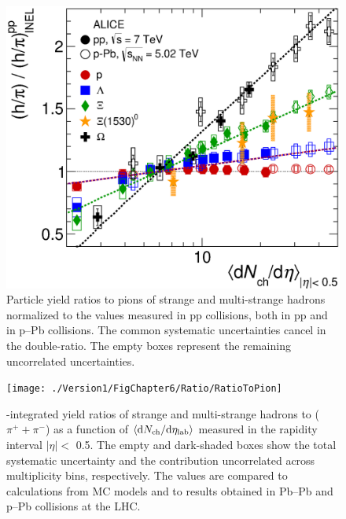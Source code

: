 \begin{figure}[htbp]
\begin{center}
\includegraphics[width=10.cm]{./Version1/FigChapter6/Ratio/RatioToPionXiStar}
\caption{ Particle yield ratios to pions of strange and multi-strange hadrons normalized to the values measured in pp collisions, both in pp and in p--Pb collisions. The common systematic uncertainties cancel in the double-ratio. The empty boxes represent the remaining uncorrelated uncertainties. %
}
\label{fig:doubler}
\end{center}
\end{figure}


\begin{figure}[htbp]
\begin{center}
\texttt{[image: ./Version1/FigChapter6/Ratio/RatioToPion]}
\caption{ \pt-integrated yield ratios of strange and multi-strange hadrons to ($\pi^{+}+\pi^{-}$) as a function of $\meandNdeta$ measured in the rapidity interval $|\eta|<$ 0.5. The empty and dark-shaded boxes show the total systematic uncertainty and the contribution uncorrelated across multiplicity bins, respectively. The values are compared to calculations from MC models and to results obtained in Pb--Pb and p--Pb collisions at the LHC.}
\label{fig:topi}
\end{center}
\end{figure}



\newpage
